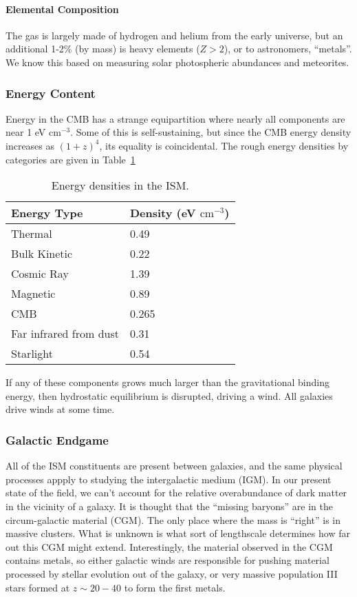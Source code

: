 \documentclass[10pt]{article}
\numberwithin{equation}{section}
\begin{document}
\paragraph{Elemental Composition} %
\label{par:elemental_composition}
The gas is largely made of hydrogen and helium from the early universe, but an additional 1-2\% (by mass) is heavy elements ($Z>2$), or to astronomers, ``metals''. We know this based on measuring solar photospheric abundances and meteorites. %

\subsubsection{Energy Content} %
\label{ssub:energy_content}
Energy in the CMB has a strange equipartition where nearly all components are near 1 eV cm$^{-3}$. Some of this is self-sustaining, but since the CMB energy density increases as $(1+z)^4$, its equality is coincidental. The rough energy densities by categories are given in Table~\ref{tab:1.1}
\begin{table}
  \centering
  \begin{tabular}{l l}
    Energy Type & Density (eV $\mathrm{cm^{-3}}$)\\
    \hline
    Thermal & 0.49\\
    Bulk Kinetic & 0.22\\
    Cosmic Ray & 1.39\\
    Magnetic & 0.89\\
    CMB & 0.265\\
    Far infrared from dust & 0.31 \\
    Starlight & 0.54
  \end{tabular}
  \caption{Energy densities in the ISM.}
  \label{tab:1.1}
\end{table}
If any of these components grows much larger than the gravitational binding energy, then hydrostatic equilibrium is disrupted, driving a wind. All galaxies drive winds at some time.
\subsubsection{Galactic Endgame} %
\label{ssub:galactic_endgame}
All of the ISM constituents are present between galaxies, and the same physical processes appply to studying the intergalactic medium (IGM). In our present state of the field, we can't account for the relative overabundance of dark matter in the vicinity of a galaxy. It is thought that the ``missing baryons'' are in the circum-galactic material (CGM). The only place where the mass is ``right'' is in massive clusters. What is unknown is what sort of lengthscale determines how far out this CGM might extend. Interestingly, the material observed in the CGM contains metals, so either galactic winds are responsible for pushing material processed by stellar evolution out of the galaxy, or very massive population III stars formed at $z\sim 20-40$ to form the first metals.
\end{document}
